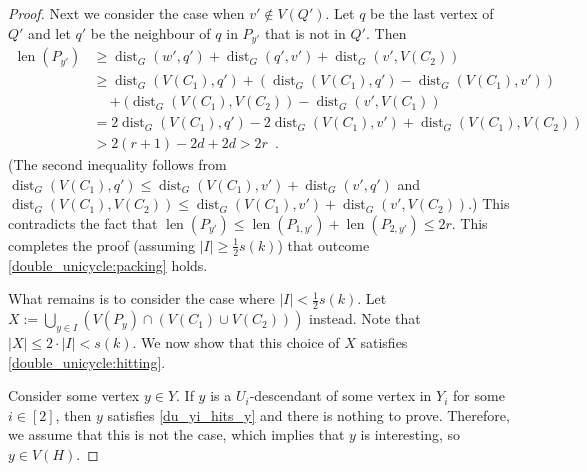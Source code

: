 \documentclass{patmorin}
\newcommand{\gwen}[1]{\textcolor{Purple}{Gwen: #1}}
\newcommand{\piotr}[1]{\textcolor{red}{Piotr: #1}}
\DeclareMathOperator{\len}{len}
\DeclareMathOperator{\dist}{dist}
\begin{document}
\begin{proof}
    Next we consider the case when $v'\notin V(Q')$. 
    Let $q$ be the last vertex of $Q'$ and let $q'$ be the neighbour of $q$ in $P_{y'}$ that is not in $Q'$.  Then
    \begin{align*}
    \len(P_{y'}) 
        & \ge \dist_G(w',q') + \dist_G(q',v') + \dist_G(v',V(C_2)) \\
        & \ge \dist_G(V(C_1),q') + (\dist_G(V(C_1),q') - \dist_G(V(C_1),v')) \\
        & \quad {} + (\dist_G(V(C_1),V(C_2))-\dist_G(v',V(C_1)) \\
        & = 2\dist_G(V(C_1),q') - 2\dist_G(V(C_1),v') + \dist_G(V(C_1),V(C_2)) \\
        & > 2(r+1) - 2d + 2d > 2r \enspace .
    \end{align*}
    (The second inequality follows from $\dist_G(V(C_1),q')\leq \dist_G(V(C_1),v')+\dist_G(v',q')$ and
    $\dist_G(V(C_1),V(C_2))\le \dist_G(V(C_1),v')+\dist_G(v',V(C_2))$.) This contradicts the fact that $\len(P_{y'})\le \len(P_{1,y'})+\len(P_{2,y'})\le 2r$.  This completes the proof (assuming $|I|\ge\tfrac{1}{2}s(k)$) that outcome \cref{double_unicycle:packing} holds.


    What remains is to consider the case where $|I|<\frac{1}{2}s(k)$.  Let $X:=\bigcup_{y\in I}\left( V(P_y)\cap(V(C_1)\cup V(C_2))\right)$ instead. 
    Note that $|X|\leq 2\cdot|I| < s(k)$. 
    We now show that this choice of $X$ satisfies \cref{double_unicycle:hitting}.

    Consider some vertex $y\in Y$.  If $y$ is a $U_i$-descendant of some vertex in $Y_i$ for some $i\in[2]$, then $y$ satisfies \cref{du_yi_hits_y} and there is nothing to prove.  Therefore, we assume that this is not the case, which implies that $y$ is interesting, so $y\in V(H)$.


\end{proof}
\end{document}
